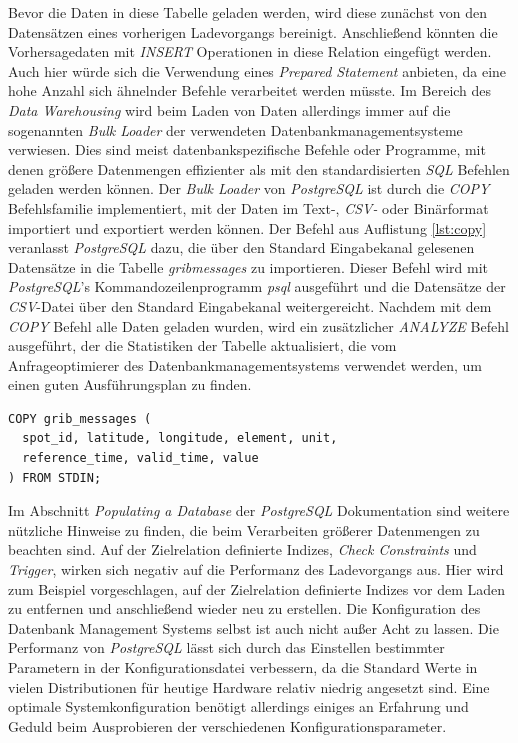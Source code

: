 Bevor die Daten in diese Tabelle geladen werden, wird diese zunächst
von den Datensätzen eines vorherigen Ladevorgangs
bereinigt. Anschließend könnten die Vorhersagedaten mit
\textit{INSERT} Operationen in diese Relation eingefügt werden. Auch
hier würde sich die Verwendung eines \textit{Prepared Statement}
anbieten, da eine hohe Anzahl sich ähnelnder Befehle verarbeitet
werden müsste. Im Bereich des \textit{Data Warehousing} wird beim
Laden von Daten allerdings immer auf die sogenannten \textit{Bulk
  Loader} der verwendeten Datenbankmanagementsysteme verwiesen. Dies
sind meist datenbankspezifische Befehle oder Programme, mit denen
größere Datenmengen effizienter als mit den standardisierten
\textit{SQL} Befehlen geladen werden können. Der \textit{Bulk Loader}
von \textit{PostgreSQL} ist durch die \textit{COPY} Befehlsfamilie
implementiert, mit der Daten im Text-, \textit{CSV-} oder Binärformat
importiert und exportiert werden können. Der Befehl aus Auflistung
\ref{lst:copy} veranlasst \textit{PostgreSQL} dazu, die über den
Standard Eingabekanal gelesenen Datensätze in die Tabelle
\textit{grib\textunderscore messages} zu importieren. Dieser Befehl
wird mit \textit{PostgreSQL}'s Kommandozeilenprogramm \textit{psql}
ausgeführt und die Datensätze der \textit{CSV}-Datei über den Standard
Eingabekanal weitergereicht. Nachdem mit dem \textit{COPY} Befehl alle
Daten geladen wurden, wird ein zusätzlicher \textit{ANALYZE} Befehl
ausgeführt, der die Statistiken der Tabelle aktualisiert, die vom
Anfrageoptimierer des Datenbankmanagementsystems verwendet werden,
um einen guten Ausführungsplan zu finden.

\begin{lstlisting}[captionpos=b, caption=Befehl zum Import von Datensätzen in \textit{PostgreSQL}, label=lst:copy]
COPY grib_messages (
  spot_id, latitude, longitude, element, unit, 
  reference_time, valid_time, value
) FROM STDIN;
\end{lstlisting}

Im Abschnitt \textit{Populating a Database} \cite{postgresql:populate}
der \textit{PostgreSQL} Dokumentation sind weitere nützliche Hinweise
zu finden, die beim Verarbeiten größerer Datenmengen zu beachten
sind. Auf der Zielrelation definierte Indizes, \textit{Check
  Constraints} und \textit{Trigger}, wirken sich negativ auf die
Performanz des Ladevorgangs aus. Hier wird zum Beispiel vorgeschlagen,
auf der Zielrelation definierte Indizes vor dem Laden zu entfernen und
anschließend wieder neu zu erstellen. Die Konfiguration des Datenbank
Management Systems selbst ist auch nicht außer Acht zu lassen. Die
Performanz von \textit{PostgreSQL} lässt sich durch das Einstellen
bestimmter Parametern in der Konfigurationsdatei verbessern, da die
Standard Werte in vielen Distributionen für heutige Hardware relativ
niedrig angesetzt sind. Eine optimale Systemkonfiguration benötigt
allerdings einiges an Erfahrung und Geduld beim Ausprobieren der
verschiedenen Konfigurationsparameter.

